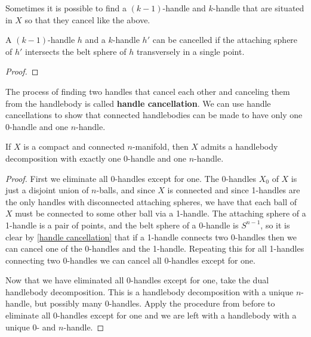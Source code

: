 Sometimes it is possible to find a $(k-1)$-handle and $k$-handle that are situated in $X$ so that they cancel like the above. 

\begin{prop}
\label{handle cancellation}
A $(k-1)$-handle $h$ and a $k$-handle $h'$ can be cancelled if the attaching sphere of $h'$ intersects the belt sphere of $h$ transversely in a single point.
\end{prop}
\begin{proof}
\end{proof}

The process of finding two handles that cancel each other and canceling them from the handlebody is called \textbf{handle cancellation}. We can use handle cancellations to show that connected handlebodies can be made to have only one 0-handle and one $n$-handle.

\begin{prop}
If $X$ is a compact and connected $n$-manifold, then $X$ admits a handlebody decomposition with exactly one 0-handle and one $n$-handle.
\end{prop}
\begin{proof}
First we eliminate all 0-handles except for one. The 0-handles $X_0$ of $X$ is just a disjoint union of $n$-balls, and since $X$ is connected and since 1-handles are the only handles with disconnected attaching spheres, we have that each ball of $X$ must be connected to some other ball via a 1-handle. The attaching sphere of a 1-handle is a pair of points, and the belt sphere of a 0-handle is $S^{n-1}$, so it is clear by \cref{handle cancellation} that if a 1-handle connects two 0-handles then we can cancel one of the 0-handles and the 1-handle. Repeating this for all 1-handles connecting two 0-handles we can cancel all 0-handles except for one. 

Now that we have eliminated all 0-handles except for one, take the dual handlebody decomposition. This is a handlebody decomposition with a unique $n$-handle, but possibly many 0-handles. Apply the procedure from before to eliminate all 0-handles except for one and we are left with a handlebody with a unique 0- and $n$-handle.
\end{proof}


